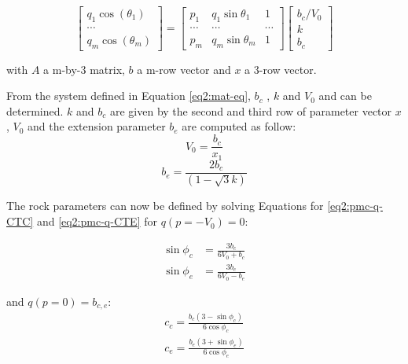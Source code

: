 \begin{equation}\label{eq2:mat-eq}
    \left[\begin{array}{c}
    {q_{1} \cos \left(\theta_{1}\right)} \\
    {\cdots} \\
    {q_{m} \cos \left(\theta_{m}\right)}
    \end{array}\right]=\left[\begin{array}{ccc}
    {p_{1}} & {q_{1} \sin \theta_{1}} & {1} \\
    {\cdots} & {\cdots} & {\cdots} \\
    {p_{m}} & {q_{m} \sin \theta_{m}} & {1}
    \end{array}\right]\left[\begin{array}{c}
    {b_{c} / V_{0}} \\
    {k} \\
    {b_{c}}
    \end{array}\right]
\end{equation}

with $A$ a m-by-3 matrix, $b$ a m-row vector and $x$  a 3-row vector. 

From the system defined in Equation \ref{eq2:mat-eq}, $b_c$ , $k$ and $V_0$  and can be determined. $k$ and $b_c$  are given by the second and third row of parameter vector $x$, $V_0$  and the extension parameter $b_e$ are computed as follow: 
\begin{equation}\label{eq2:pmc_vo}
    V_0 = \frac{b_c}{x_1}
\end{equation}
\begin{equation}\label{eq2:pmc_be}
    b_e = \frac{2b_c}{(1-\sqrt{3}k)} 
\end{equation}

The rock parameters can now be defined by solving Equations for \ref{eq2:pmc-q-CTC} and \ref{eq2:pmc-q-CTE} for $q(p=-V_0)=0$:

\begin{align}\label{eq2:pmc_phi}
    \sin \phi_c &= \frac{3b_c}{6V_0+b_c} \\
    \sin \phi_e &= \frac{3b_e}{6V_0-b_e} 
\end{align}

and $q(p=0)=b_{c,e}$:
\begin{align}\label{eq2:pmc_c}
    c_{c} =\frac{b_{c}\left(3-\sin \phi_{c}\right)}{6 \cos \phi_{c}} \\
    c_{e} =\frac{b_{e}\left(3+\sin \phi_{e}\right)}{6 \cos \phi_{e}}
\end{align}